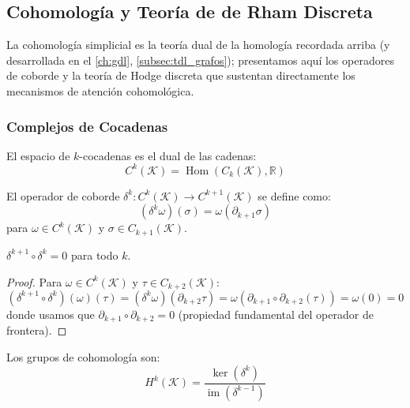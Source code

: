 \subsection{Cohomología y Teoría de de Rham Discreta}

La cohomología simplicial es la teoría dual de la homología recordada arriba (y desarrollada en el \autoref{ch:gdl}, \autoref{subsec:tdl_grafos}); presentamos aquí los operadores de coborde y la teoría de Hodge discreta que sustentan directamente los mecanismos de atención cohomológica.

\subsubsection{Complejos de Cocadenas}

\begin{definition}\label{def:espacio_cocadenas}
El espacio de $k$-cocadenas es el dual de las cadenas:
\begin{equation}
    C^k(\mathcal{K}) = \operatorname{Hom}(C_k(\mathcal{K}), \mathbb{R})
\end{equation}
\end{definition}

\begin{definition}\label{def:operador_coborde}
El operador de coborde $\delta^k: C^k(\mathcal{K}) \to C^{k+1}(\mathcal{K})$ se define como:
\begin{equation}
    (\delta^k \omega)(\sigma) = \omega(\partial_{k+1} \sigma)
\end{equation}
para $\omega \in C^k(\mathcal{K})$ y $\sigma \in C_{k+1}(\mathcal{K})$.
\end{definition}

\begin{theorem}\label{thm:coborde_coborde_cero}
$\delta^{k+1} \circ \delta^k = 0$ para todo $k$.
\end{theorem}

\begin{proof}
Para $\omega \in C^k(\mathcal{K})$ y $\tau \in C_{k+2}(\mathcal{K})$:
\[
(\delta^{k+1} \circ \delta^k)(\omega)(\tau) = (\delta^k \omega)(\partial_{k+2}\tau) = \omega(\partial_{k+1} \circ \partial_{k+2}(\tau)) = \omega(0) = 0
\]
donde usamos que $\partial_{k+1} \circ \partial_{k+2} = 0$ (propiedad fundamental del operador de frontera).
\end{proof}

\begin{definition}\label{def:grupos_cohomologia}
Los grupos de cohomología son:
\begin{equation}
    H^k(\mathcal{K}) = \frac{\ker(\delta^k)}{\operatorname{im}(\delta^{k-1})}
\end{equation}
\end{definition}

